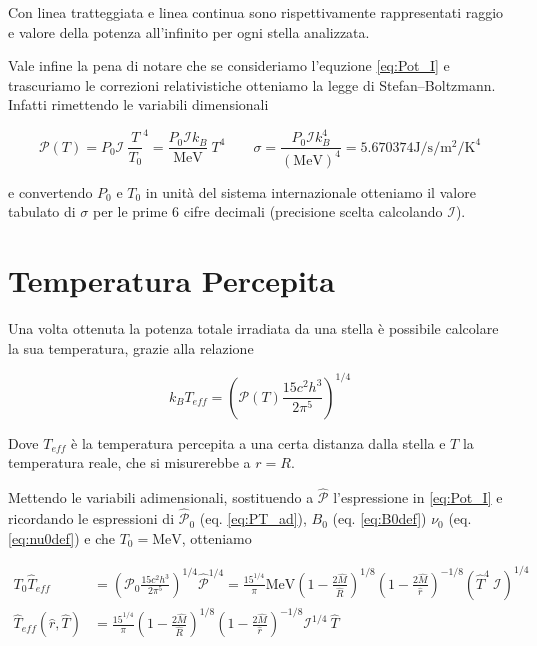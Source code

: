 \documentclass[a4paper, titlepage]{article}
\begin{document}
Con linea tratteggiata e linea continua sono rispettivamente rappresentati
raggio e valore della potenza all'infinito per ogni stella analizzata.

Vale infine la pena di notare che se consideriamo l'equzione \ref{eq:Pot_I} e
trascuriamo le correzioni relativistiche otteniamo la legge di Stefan–Boltzmann.
Infatti rimettendo le variabili dimensionali

\begin{equation}
    \mathcal P (T) = P_0 \mathcal I ~ \frac{T}{T_0}^4
    = \frac{P_0 \mathcal I k_B}{\unit{\mega\electronvolt}} ~ T^4
    \quad \quad
    \sigma = \frac{P_0 \mathcal I k_B^4}{(\unit{\mega\electronvolt})^4}
    = 5.670374 \unit{\joule\per\second\per\meter\squared\per\kelvin\tothe4}
\end{equation}

e convertendo $P_0$ e $T_0$ in unità del sistema internazionale otteniamo il
valore tabulato di $\sigma$ per le prime 6 cifre decimali (precisione scelta
calcolando $\mathcal I$).


\newpage


\section{Temperatura Percepita}
\label{sec:temp_perc}

Una volta ottenuta la potenza totale irradiata da una stella è possibile
calcolare la sua temperatura, grazie alla relazione

\begin{equation}
    k_B T_{eff} = \left( \mathcal P (T) \frac{15 c^2 h^3}{2 \pi^5} \right)^{1/4}
    \label{eq:Teff}
\end{equation}

Dove $T_{eff}$ è la temperatura percepita a una certa distanza dalla stella e
$T$ la temperatura reale, che si misurerebbe a $r = R$.

Mettendo le variabili adimensionali, sostituendo a $\mathcal{\hat P}$
l'espressione in \ref{eq:Pot_I} e ricordando le espressioni di
$\mathcal{\hat P}_0$ (eq. \ref{eq:PT_ad}), $B_0$ (eq. \ref{eq:B0def}) $\nu_0$
(eq. \ref{eq:nu0def}) e che $T_0 = \unit{\mega\electronvolt}$, otteniamo

\begin{align}
    T_0 \hat T_{eff}
    &= \left( \mathcal P_0 \frac{15 c^2 h^3}{2 \pi^5} \right)^{1/4}
    \mathcal{\hat P}^{1/4}
    = \frac{15^{1/4}}{\pi} \unit{\mega\electronvolt}
    \left(1 - \frac{2 \hat M}{\hat R}\right)^{1/8}
    \left(1 - \frac{2 \hat M}{\hat r}\right)^{-1/8}
    (\hat T^4 ~ \mathcal I)^{1/4} \\
    \hat T_{eff}(\hat r, \hat T)
    &= \frac{15^{1/4}}{\pi} \left(1 - \frac{2 \hat M}{\hat R} \right)^{1/8}
    \left(1 - \frac{2 \hat M}{\hat r}\right)^{-1/8} \mathcal I^{1/4} ~ \hat T \\
    \label{eq:Teff_ad}
\end{align}
\end{document}
